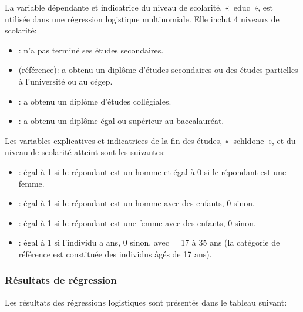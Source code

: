 \documentclass[letterpaper,10pt,french]{sphinxmanual}
\begin{document}
La variable dépendante et indicatrice du niveau de scolarité, « educ », est utilisée dans une régression logistique multinomiale. Elle inclut 4 niveaux de scolarité:
\begin{itemize}
\item {} 
: n’a pas terminé ses études secondaires.

\item {} 
 (référence): a obtenu un diplôme d’études secondaires ou des études partielles à l’université ou au cégep.

\item {} 
: a obtenu un diplôme d’études collégiales.

\item {} 
: a obtenu un diplôme égal ou supérieur au baccalauréat.

\end{itemize}

Les variables explicatives et indicatrices de la fin des études, « schldone », et du niveau de scolarité atteint sont les suivantes:
\begin{itemize}
\item {} 
: égal à 1 si le répondant est un homme et égal à 0 si le répondant est une femme.

\item {} 
: égal à 1 si le répondant est un homme avec des enfants, 0 sinon.

\item {} 
: égal à 1 si le répondant est une femme avec des enfants, 0 sinon.

\item {} 
: égal à 1 si l’individu a  ans, 0 sinon, avec  = 17 à 35 ans (la catégorie de référence est constituée des individus âgés de 17 ans).

\end{itemize}


\subsubsection{Résultats de régression}
\label{\detokenize{methodologie:id5}}
Les résultats des régressions logistiques sont présentés dans le tableau suivant:
\end{document}
